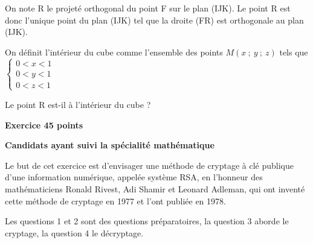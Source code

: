 \documentclass[10pt,a4paper]{article}
\begin{document}
\medskip

On note R le projeté orthogonal du point F sur le plan (IJK). Le point R est donc l'unique point du
plan (IJK) tel que la droite (FR) est orthogonale au plan (IJK).


On définit l'intérieur du cube comme l'ensemble des points $M(x~;~y~;~z)$ tels que $\left\{\begin{array}{l}
0 < x < 1\\
0 < y < 1\\
0 < z < 1
\end{array}\right.$

Le point R est-il à l'intérieur du cube ?

\textbf{Exercice 4\hfill 5 points}
 
\textbf{Candidats ayant suivi la spécialité mathématique}

\medskip

Le but de cet exercice est d'envisager une méthode de cryptage à clé publique d'une information
numérique, appelée système RSA, en l'honneur des mathématiciens Ronald Rivest, Adi Shamir et
Leonard Adleman, qui ont inventé cette méthode de cryptage en 1977 et l'ont publiée en 1978.

\smallskip

Les questions 1 et 2 sont des questions préparatoires, la question 3 aborde le cryptage, la question 4
le décryptage.

\bigskip
\end{document}
